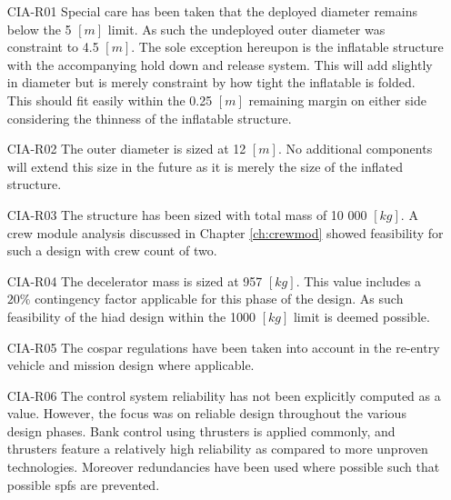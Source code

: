 \begin{itemize}[leftmargin=+20mm]
\item[CIA-R01] Special care has been taken that the deployed diameter remains below the 5 $[m]$ limit. As such the undeployed outer diameter was constraint to 4.5 $[m]$. The sole exception hereupon is the inflatable structure with the accompanying hold down and release system. This will add slightly in diameter but is merely constraint by how tight the inflatable is folded. This should fit easily within the 0.25 $[m]$ remaining margin on either side considering the thinness of the inflatable structure. 
\item[CIA-R02] The outer diameter is sized at 12 $[m]$. No additional components will extend this size in the future as it is merely the size of the inflated structure.
\item[CIA-R03] The structure has been sized with total mass of 10 000 $[kg]$. A crew module analysis discussed in Chapter \ref{ch:crewmod} showed feasibility for such a design with crew count of two.
\item[CIA-R04] The decelerator mass is sized at 957 $[kg]$. This value includes a $20\%$ contingency factor applicable for this phase of the design. As such feasibility of the \gls{hiad} design within the 1000 $[kg]$ limit is deemed possible.
\item[CIA-R05] The \gls{cospar} regulations have been taken into account in the re-entry vehicle and mission design where applicable.
\item[CIA-R06] The control system reliability has not been explicitly computed as a value. However, the focus was on reliable design throughout the various design phases. Bank control using thrusters is applied commonly, and thrusters feature a relatively high reliability as compared to more unproven technologies. Moreover redundancies have been used where possible such that possible \glspl{spf} are prevented. 
\end{itemize}


